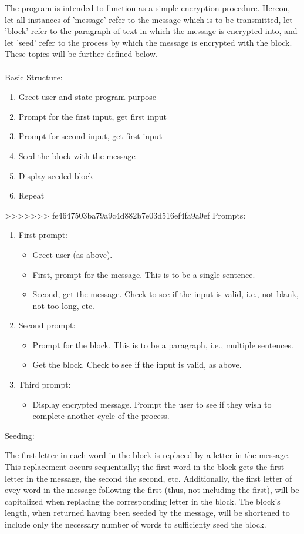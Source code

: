 \documentclass[12]{article}
\begin{document}
	The program is intended to function as a simple encryption procedure. Hereon, let all instances of 'message' refer to the message which is to be transmitted, let 'block' refer to the paragraph of text in which the message is encrypted into, and let 'seed' refer to the process by which the message is encrypted with the block. These topics will be further defined below.\\
\\
Basic Structure:
\begin{enumerate}
\item Greet user and state program purpose
\item Prompt for the first input, get first input
\item Prompt for second input, get first input
\item Seed the block with the message
\item Display seeded block
\item Repeat
\end{enumerate}
>>>>>>> fe4647503ba79a9c4d882b7e03d516ef4fa9a0ef
	Prompts:
\begin{enumerate}
\item First prompt:
	\begin{itemize}
	\item Greet user (as above).
	\item First, prompt for the message. This is to be a single sentence. 
	\item Second, get the message. Check to see if the input is valid, i.e., not blank, not too long, etc.
	\end{itemize}
\item Second prompt:
	\begin{itemize}
	\item Prompt for the block. This is to be a paragraph, i.e., multiple sentences.
	\item Get the block. Check to see if the input is valid, as above.
	\end{itemize}
\item Third prompt:
	\begin{itemize}
	\item Display encrypted message. Prompt the user to see if they wish to complete another cycle of the process.
	\end{itemize}
\end{enumerate}
Seeding:

	The first letter in each word in the block is replaced by a letter in the message. This replacement occurs sequentially; the first word in the block gets the first letter in the message, the second the second, etc. Additionally, the first letter of evey word in the message following the first (thus, not including the first), will be capitalized when replacing the corresponding letter in the block. The block's length, when returned having been seeded by the message, will be shortened to include only the necessary number of words to sufficienty seed the block.
	
\end{document}
